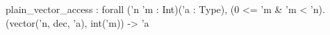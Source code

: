 plain_vector_access : forall ('n 'm : Int)('a : Type), (0 <= 'm & 'm < 'n). (vector('n, dec, 'a), int('m)) -> 'a